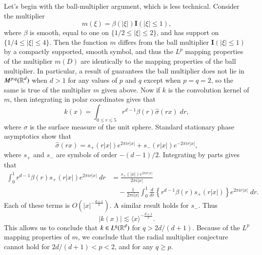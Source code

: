 Let's begin with the ball-multiplier argument, which is less technical. Consider the multiplier
%
\[ m(\xi) = \beta(|\xi|) \mathbf{I}(|\xi| \leq 1), \]
%
where $\beta$ is smooth, equal to one on $\{ 1/2 \leq |\xi| \leq 2 \}$, and has support on $\{ 1/4 \leq |\xi| \leq 4 \}$. Then the function $m$ differs from the ball multiplier $\mathbf{I}(|\xi| \leq 1)$ by a compactly supported, smooth symbol, and thus the $L^p$ mapping properties of the multiplier $m(D)$ are identically to the mapping properties of the ball multiplier. In particular, a result of \cite{Fefferman} guarantees the ball multiplier does not lie in $M^{p,q}(\operatorname{\mathbb{R}}^d)$ when $d > 1$ for any values of $p$ and $q$ except when $p = q = 2$, so the same is true of the multiplier $m$ given above. Now if $k$ is the convolution kernel of $m$, then integrating in polar coordinates gives that
%
\[ k(x) = \int_{0 \leq r \leq 5} r^{d-1} \beta(r) \widehat{\sigma}(r x)\; dr, \]
%
where $\sigma$ is the surface measure of the unit sphere. Standard stationary phase asymptotics show that
%
\[ \widehat{\sigma}(rx) = s_+(r |x|) e^{2 \pi i r |x|} + s_-(r |x|) e^{- 2 \pi i r |x|}, \]
%
where $s_+$ and $s_-$ are symbols of order $-(d-1)/2$. Integrating by parts gives that
%
\begin{align*}
    \int_0^1 r^{d-1} \beta(r) s_+(r|x|) e^{2 \pi i r |x|}\; dr &= \frac{s_+(|x|) e^{2 \pi i r |x|}}{2 \pi i |x|}\\
    &\quad - \frac{1}{2 \pi i |x|} \int_0^1 \frac{d}{dr} \left\{ r^{d-1} \beta(r) s_+(r|x|) \right\} e^{2 \pi i r |x|}\; dr.
\end{align*}
%
Each of these terms is $O( |x|^{- \frac{d+1}{2}} )$. A similar result holds for $s_-$. Thus
%
\[ |k(x)| \lesssim \langle x \rangle^{- \frac{d+1}{2}}. \]
%
This allows us to conclude that $k \in L^q(\operatorname{\mathbb{R}}^d)$ for $q > 2d/(d+1)$. Because of the $L^p$ mapping properties of $m$, we conclude that the radial multiplier conjecture cannot hold for $2d/(d+1) < p < 2$, and for any $q \geq p$.

